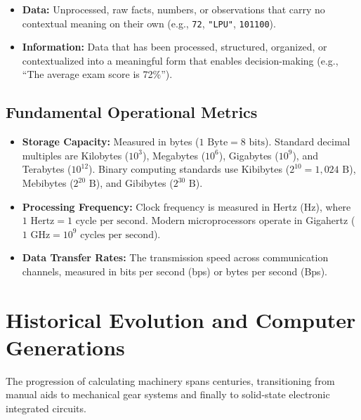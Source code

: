 \begin{definition}
\begin{itemize}[leftmargin=1.2em]
    \item \textbf{Data:} Unprocessed, raw facts, numbers, or observations that carry no contextual meaning on their own (e.g., \texttt{72}, \texttt{"LPU"}, \texttt{101100}).
    \item \textbf{Information:} Data that has been processed, structured, organized, or contextualized into a meaningful form that enables decision-making (e.g., ``The average exam score is 72\%'').
\end{itemize}
\end{definition}

\subsection{Fundamental Operational Metrics}
\begin{itemize}[leftmargin=1.2em]
    \item \textbf{Storage Capacity:} Measured in bytes ($1\text{ Byte} = 8\text{ bits}$). Standard decimal multiples are Kilobytes ($10^3$), Megabytes ($10^6$), Gigabytes ($10^9$), and Terabytes ($10^{12}$). Binary computing standards use Kibibytes ($2^{10} = 1,024\text{ B}$), Mebibytes ($2^{20}\text{ B}$), and Gibibytes ($2^{30}\text{ B}$).
    \item \textbf{Processing Frequency:} Clock frequency is measured in Hertz (Hz), where $1\text{ Hertz} = 1\text{ cycle per second}$. Modern microprocessors operate in Gigahertz ($1\text{ GHz} = 10^9\text{ cycles per second}$).
    \item \textbf{Data Transfer Rates:} The transmission speed across communication channels, measured in bits per second (bps) or bytes per second (Bps).
\end{itemize}

\section{Historical Evolution and Computer Generations}

The progression of calculating machinery spans centuries, transitioning from manual aids to mechanical gear systems and finally to solid-state electronic integrated circuits.

